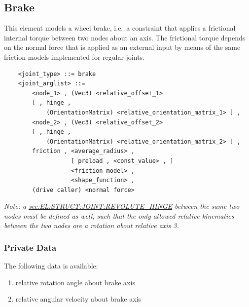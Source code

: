 \subsection{Brake}
This element models a wheel brake, i.e.\ a constraint that applies
a frictional internal torque between two nodes about an axis.
The frictional torque depends on the normal force that is applied 
as an external input by means of the same friction models implemented
for regular joints.
\begin{verbatim}
    <joint_type> ::= brake
    <joint_arglist> ::= 
        <node_1> , (Vec3) <relative_offset_1> 
        [ , hinge , 
            (OrientationMatrix) <relative_orientation_matrix_1> ] ,
        <node_2> , (Vec3) <relative_offset_2>
        [ , hinge , 
            (OrientationMatrix) <relative_orientation_matrix_2> ] ,
        friction , <average_radius> , 
                   [ preload , <const_value> , ]
                   <friction_model> , 
                   <shape_function> ,
        (drive caller) <normal force>
\end{verbatim}
\emph{Note: a
\hyperref{\kw{revolute hinge}}{\kw{revolute hinge} (see Section~}{)}{sec:EL:STRUCT:JOINT:REVOLUTE_HINGE}
between the same two nodes must be defined as well, such that
the only allowed relative kinematics between the two nodes are
a rotation about relative axis 3.
}

\subsubsection{Private Data}
The following data is available:
\begin{enumerate}
\item {} relative rotation angle about brake axis
\item {} relative angular velocity about brake axis
\end{enumerate}




